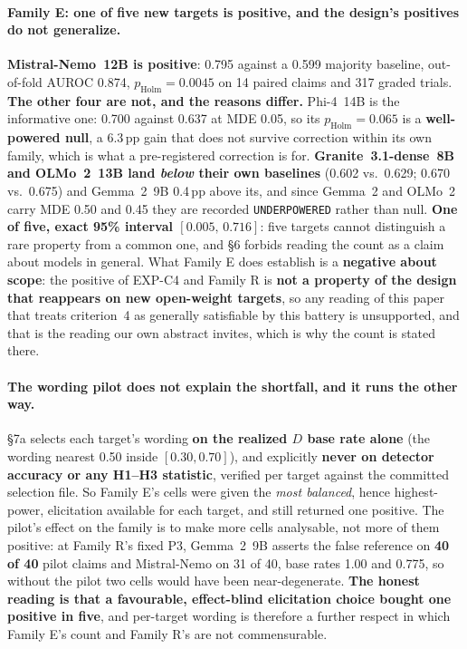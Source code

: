 \paragraph{Family E: one of five new targets is positive, and the design's positives do not generalize.} \textbf{Mistral-Nemo~12B is positive}: 0.795 against a 0.599 majority baseline, out-of-fold AUROC 0.874, $p_{\mathrm{Holm}}\!=\!0.0045$ on 14 paired claims and 317 graded trials. \textbf{The other four are not, and the reasons differ.} Phi-4~14B is the informative one: 0.700 against 0.637 at MDE 0.05, so its $p_{\mathrm{Holm}}\!=\!0.065$ is a \textbf{well-powered null}, a 6.3\,pp gain that does not survive correction within its own family, which is what a pre-registered correction is for. \textbf{Granite~3.1-dense~8B and OLMo~2~13B land \emph{below} their own baselines} (0.602 vs.\ 0.629; 0.670 vs.\ 0.675) and Gemma~2~9B 0.4\,pp above its, and since Gemma~2 and OLMo~2 carry MDE 0.50 and 0.45 they are recorded \texttt{UNDERPOWERED} rather than null. \textbf{One of five, exact 95\% interval $[0.005,\,0.716]$}: five targets cannot distinguish a rare property from a common one, and §6 forbids reading the count as a claim about models in general. What Family E does establish is a \textbf{negative about scope}: the positive of EXP-C4 and Family R is \textbf{not a property of the design that reappears on new open-weight targets}, so any reading of this paper that treats criterion~4 as generally satisfiable by this battery is unsupported, and that is the reading our own abstract invites, which is why the count is stated there.

\paragraph{The wording pilot does not explain the shortfall, and it runs the other way.} §7a selects each target's wording \textbf{on the realized $D$ base rate alone} (the wording nearest 0.50 inside $[0.30,0.70]$), and explicitly \textbf{never on detector accuracy or any H1--H3 statistic}, verified per target against the committed selection file. So Family E's cells were given the \emph{most balanced}, hence highest-power, elicitation available for each target, and still returned one positive. The pilot's effect on the family is to make more cells analysable, not more of them positive: at Family R's fixed P3, Gemma~2~9B asserts the false reference on \textbf{40 of 40} pilot claims and Mistral-Nemo on 31 of 40, base rates 1.00 and 0.775, so without the pilot two cells would have been near-degenerate. \textbf{The honest reading is that a favourable, effect-blind elicitation choice bought one positive in five}, and per-target wording is therefore a further respect in which Family E's count and Family R's are not commensurable.

